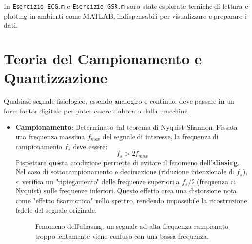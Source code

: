 In \verb|Esercizio_ECG.m| e \verb|Esercizio_GSR.m| sono state esplorate tecniche di lettura e plotting in ambienti come MATLAB, indispensabili per visualizzare e preparare i dati.

\section{Teoria del Campionamento e Quantizzazione}
Qualsiasi segnale fisiologico, essendo analogico e continuo, deve passare in un form factor digitale per poter essere elaborato dalla macchina.
\begin{itemize}
    \item \textbf{Campionamento}: Determinato dal teorema di Nyquist-Shannon.
    Fissata una frequenza massima $f_{max}$ del segnale di interesse, la frequenza di campionamento $f_s$ deve essere:
    \begin{equation}
        f_s > 2 f_{max}
    \end{equation}
    Rispettare questa condizione permette di evitare il fenomeno dell'\textbf{aliasing}. Nel caso di sottocampionamento o decimazione (riduzione intenzionale di $f_s$), si verifica un "ripiegamento" delle frequenze superiori a $f_s/2$ (frequenza di Nyquist) sulle frequenze inferiori. Questo effetto crea una distorsione nota come "effetto fisarmonica" nello spettro, rendendo impossibile la ricostruzione fedele del segnale originale.

    \vspace{0.5cm}
    \begin{figure}[h!]
        \centering
        \caption{Fenomeno dell'aliasing: un segnale ad alta frequenza campionato troppo lentamente viene confuso con una bassa frequenza.}
    \end{figure}
    \vspace{0.5cm}


\end{itemize}
